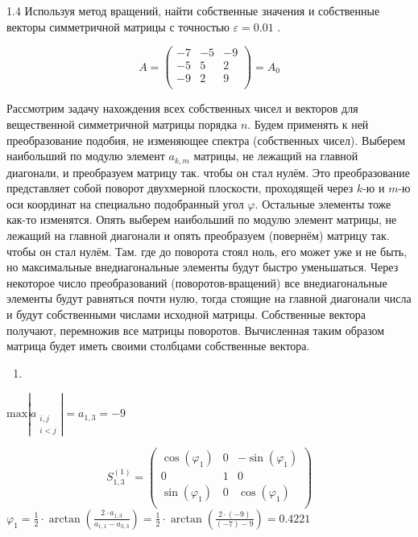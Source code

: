 \documentclass[10pt, a4paper]{scrartcl}
\begin{document}
\pagebreak

1.4 Используя метод вращений, найти собственные значения и собственные
векторы симметричной матрицы с точностью \(\varepsilon = 0.01\) .

\[A = \begin{pmatrix} 
-7 & -5 & -9\\
-5 & 5 & 2\\
-9 & 2 & 9\\
\end{pmatrix} = A_{0}\]

Рассмотрим задачу нахождения всех собственных чисел и векторов для
вещественной симметричной матрицы порядка \(n\). Будем применять к ней
преобразование подобия, не изменяющее спектра (собственных чисел).
Выберем наибольший по модулю элемент \(a_{k,m}\) матрицы, не лежащий на
главной диагонали, и преобразуем матрицу так. чтобы он стал нулём. Это
преобразование представляет собой поворот двухмерной плоскости,
проходящей через \(k\)-ю и \(m\)-ю оси координат на специально
подобранный угол \(\varphi\). Остальные элементы тоже как-то изменятся.
Опять выберем наибольший по модулю элемент матрицы, не лежащий на
главной диагонали и опять преобразуем (повернём) матрицу так. чтобы он
стал нулём. Там. где до поворота стоял ноль, его может уже и не быть, но
максимальные внедиагональные элементы будут быстро уменьшаться. Через
некоторое число преобразований (поворотов-вращений) все внедиагональные
элементы будут равняться почти нулю, тогда стоящие на главной диагонали
числа и будут собственными числами исходной матрицы. Собственные вектора
получают, перемножив все матрицы поворотов. Вычисленная таким образом
матрица будет иметь своими столбцами собственные вектора.

\begin{enumerate}
\def\labelenumi{\arabic{enumi})}
\item
\end{enumerate}

\(\displaystyle \text{max} |a_{\substack{i,j \\ i<j}}| = a_{1,3} = -9\)

\[S_{1,3}^{(1)} = \begin{pmatrix} 
\cos(\varphi_{1}) & 0 & -\sin(\varphi_{1})\\
0 & 1 & 0\\
\sin(\varphi_{1}) & 0 & \cos(\varphi_{1})\\
\end{pmatrix}\]
\(\displaystyle \varphi_{1} = \frac{1}{2} \cdot \arctan\left(\frac{2 \cdot a_{1,3}}{a_{1,1} - a_{3,3}}\right) = \frac{1}{2} \cdot \arctan\left(\frac{2 \cdot (-9)}{(-7) - 9}\right) = 0.4221\)
\end{document}
